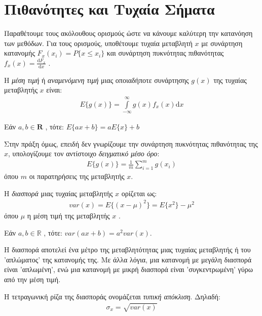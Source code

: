 \section{Πιθανότητες και Τυχαία Σήματα} \label{sec:1.2}
\justifying
Παραθέτουμε τους ακόλουθους ορισμούς \cite{prob:15} ώστε να κάνουμε καλύτερη την κατανόηση των μεθόδων. Για τους ορισμούς, υποθέτουμε τυχαία μεταβλητή \en $x$ \gr με συνάρτηση κατανομής \en $F_x(x_i) = P\{x \leq x_i \}$ \gr και συνάρτηση πυκνότητας πιθανότητας \en $f_x(x) = \frac{\mathrm{d} F_x }{\mathrm{d} x} $ \gr.
\begin{definition} \label{def:1.8}
Η \emph{μέση τιμή} ή \emph{αναμενόμενη τιμή} μιας οποιαδήποτε συνάρτησης \en $g(x)$ \gr της τυχαίας μεταβλητής \en $x$ \gr είναι:
\begin{align*}
    E\{g(x)\} = \int\limits_{-\infty}^{\infty} g(x)f_x(x) \mathrm{d}x
\end{align*}
\end{definition}
\begin{proposition} \label{prop:1.4}
Εάν \en $a,b \in \mathbf{R}$ \gr, τότε: $E\{ax+b\} = aE\{x\}+b$
\end{proposition}
Στην πράξη όμως, επειδή δεν γνωρίζουμε την συνάρτηση πυκνότητας πιθανότητας της \en $x$, \gr υπολογίζουμε τον αντίστοιχο \emph{δειγματικό μέσο όρο}: \en
\begin{align*}
    E \{ g(x) \} = \frac{1}{m} \sum\limits_{i=1}^{m} g(x_i)
\end{align*} \gr
όπου \en $m$ \gr οι παρατηρήσεις της μεταβλητής \en $x$. \gr
\begin{definition} \label{def:1.9}
Η \emph{διασπορά} μιας τυχαίας μεταβλητής \en $x$ \gr ορίζεται ως: \en
\begin{align*}
    var(x) = E\{ (x-\mu)^2 \} = E\{x^2\} - \mu^2
\end{align*} 
όπου $μ$ η μέση τιμή της μεταβλητής \en $x$ \gr.
\end{definition}
\gr 
\begin{proposition} \label{prop:1.5}
Εάν \en $a,b \in \mathbb{R}$ \gr, τότε: $var(ax+b) = a^2 var(x)  $.
\end{proposition}
Η διασπορά αποτελεί ένα μέτρο της μεταβλητότητας μιας τυχαίας μεταβλητής ή του 'απλώματος' της κατανομής της. Με άλλα λόγια, μια κατανομή με μεγάλη διασπορά είναι 'απλωμένη', ενώ μια κατανομή με μικρή διασπορά είναι 'συγκεντρωμένη' γύρω από την μέση τιμή.
\begin{definition} \label{def:1.10}
Η τετραγωνική ρίζα της διασποράς ονομάζεται \emph{τυπική απόκλιση}. Δηλαδή: \en
\begin{align*}
    \sigma_x = \sqrt{var(x)}
\end{align*}
\end{definition}
